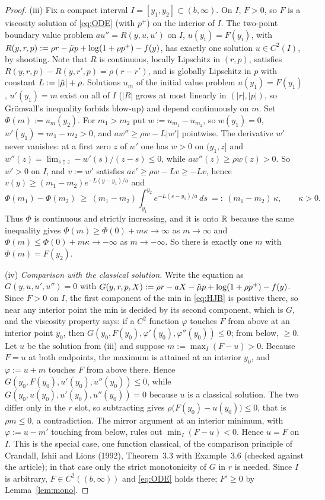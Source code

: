 \begin{proof}
(iii) Fix a compact interval $I=[y_1,y_2]\subset(b,\infty)$. On $I$, $F>0$, so $F$ is a viscosity solution of \eqref{eq:ODE} (with $p^+$) on the interior of $I$. The two-point boundary value problem $a u''=R(y,u,u')$ on $I$, $u(y_i)=F(y_i)$, with $R(y,r,p):=\rho r-\tilde\mu p+\log(1+\rho p^+)-f(y)$, has exactly one solution $u\in C^2(I)$, by shooting. Note that $R$ is continuous, locally Lipschitz in $(r,p)$, satisfies $R(y,r,p)-R(y,r',p)=\rho(r-r')$, and is globally Lipschitz in $p$ with constant $L:=|\tilde\mu|+\rho$. Solutions $u_m$ of the initial value problem $u(y_1)=F(y_1)$, $u'(y_1)=m$ exist on all of $I$ ($|R|$ grows at most linearly in $(|r|,|p|)$, so Gr\"onwall's inequality forbids blow-up) and depend continuously on $m$. Set $\Phi(m):=u_m(y_2)$. For $m_1>m_2$ put $w:=u_{m_1}-u_{m_2}$, so $w(y_1)=0$, $w'(y_1)=m_1-m_2>0$, and $aw''\ge\rho w-L|w'|$ pointwise. The derivative $w'$ never vanishes: at a first zero $z$ of $w'$ one has $w>0$ on $(y_1,z]$ and $w''(z)=\lim_{s\uparrow z}-w'(s)/(z-s)\le0$, while $aw''(z)\ge\rho w(z)>0$. So $w'>0$ on $I$, and $v:=w'$ satisfies $av'\ge\rho w-Lv\ge-Lv$, hence $v(y)\ge(m_1-m_2)e^{-L(y-y_1)/a}$ and
\[
\Phi(m_1)-\Phi(m_2)\ \ge\ (m_1-m_2)\int_{y_1}^{y_2}e^{-L(s-y_1)/a}\,ds\ =:\ (m_1-m_2)\,\kappa,\qquad \kappa>0 .
\]
Thus $\Phi$ is continuous and strictly increasing, and it is onto $\mathbb{R}$ because the same inequality gives $\Phi(m)\ge\Phi(0)+m\kappa\to\infty$ as $m\to\infty$ and $\Phi(m)\le\Phi(0)+m\kappa\to-\infty$ as $m\to-\infty$. So there is exactly one $m$ with $\Phi(m)=F(y_2)$.

(iv) \emph{Comparison with the classical solution.} Write the equation as $G(y,u,u',u'')=0$ with $G(y,r,p,X):=\rho r-aX-\tilde\mu p+\log(1+\rho p^+)-f(y)$. Since $F>0$ on $I$, the first component of the min in \eqref{eq:HJB} is positive there, so near any interior point the min is decided by its second component, which is $G$, and the viscosity property says: if a $C^2$ function $\varphi$ touches $F$ from above at an interior point $y_0$, then $G(y_0,F(y_0),\varphi'(y_0),\varphi''(y_0))\le0$; from below, $\ge0$. Let $u$ be the solution from (iii) and suppose $m:=\max_I(F-u)>0$. Because $F=u$ at both endpoints, the maximum is attained at an interior $y_0$, and $\varphi:=u+m$ touches $F$ from above there. Hence $G(y_0,F(y_0),u'(y_0),u''(y_0))\le0$, while $G(y_0,u(y_0),u'(y_0),u''(y_0))=0$ because $u$ is a classical solution. The two differ only in the $r$ slot, so subtracting gives $\rho\big(F(y_0)-u(y_0)\big)\le0$, that is $\rho m\le0$, a contradiction. The mirror argument at an interior minimum, with $\varphi:=u-m'$ touching from below, rules out $\min_I(F-u)<0$. Hence $u=F$ on $I$. This is the special case, one function classical, of the comparison principle of Crandall, Ishii and Lions (1992), Theorem~3.3 with Example~3.6 (checked against the article); in that case only the strict monotonicity of $G$ in $r$ is needed. Since $I$ is arbitrary, $F\in C^2((b,\infty))$ and \eqref{eq:ODE} holds there; $F'\ge0$ by Lemma~\ref{lem:mono}.
\end{proof}

